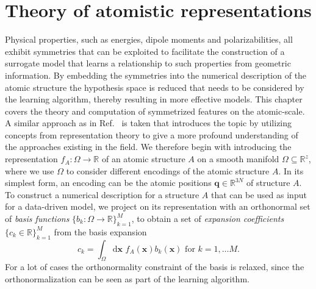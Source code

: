 \chapter{Theory of atomistic representations}
\label{sec:atomistic_representation}

Physical properties, such as energies, dipole moments and polarizabilities, all exhibit symmetries that can be exploited to facilitate the construction of a surrogate model that learns a relationship to such properties from geometric information.
By embedding the symmetries into the numerical description of the atomic structure the hypothesis space is reduced that needs to be considered by the learning algorithm, thereby resulting in more effective models.
This chapter covers the theory and computation of symmetrized features on the atomic-scale.
A similar approach as in Ref.~\cite{will+19jcp} is taken that introduces the topic by utilizing concepts from representation theory to give a more profound understanding of the approaches existing in the field.
We therefore begin with introducing the representation $f_A:\Omega\rightarrow\mathbb{R}$ of an atomic structure $A$ on a smooth manifold $\Omega\subseteq\mathbb{R}^{z}$, where we use $\Omega$ to consider different encodings of the atomic structure $A$.
In its simplest form, an encoding can be the atomic positions $\mathbf{q}\in\mathbb{R}^{3N}$ of structure $A$.
To construct a numerical description for a structure $A$ that can be used as input for a data-driven model, we project on its representation with an orthonormal set of \emph{basis functions} $\{b_k:\Omega\rightarrow\mathbb{R}\}_{k=1}^{M}$, to obtain a set of \emph{expansion coefficients} $\{c_k\in\mathbb{R}\}_{k=1}^{M}$ from the basis expansion
\begin{equation}
  c_k = \int_\Omega\mathrm{d}\mathbf{x}\,\, f_A(\mathbf{x})b_k(\mathbf{x})\text{ for }k=1,\ldots M.
\end{equation}
For a lot of cases the orthonormality constraint of the basis is relaxed, since the orthonormalization can be seen as part of the learning algorithm.
